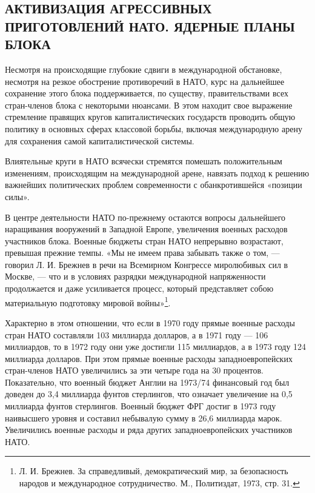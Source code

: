 \documentclass[12pt, a4paper, openany]{book}
\begin{document}
		\subsection[Активизация агрессивных приготовлений НАТО. Ядерные планы блока]{\center АКТИВИЗАЦИЯ АГРЕССИВНЫХ ПРИГОТОВЛЕНИЙ НАТО. ЯДЕРНЫЕ ПЛАНЫ БЛОКА}	
	
	
	Несмотря на происходящие глубокие сдвиги в международной обстановке, несмотря на резкое обострение противоречий в НАТО, курс на дальнейшее сохранение этого блока поддерживается, по существу, правительствами всех стран-членов блока с некоторыми нюансами. В этом находит свое выражение стремление правящих кругов капиталистических государств проводить общую политику в основных сферах классовой борьбы, включая международную арену для сохранения самой капиталистической системы.
	
	Влиятельные круги в НАТО всячески стремятся помешать положительным изменениям, происходящим на международной арене, навязать подход к решению важнейших политических проблем современности с обанкротившейся «позиции силы».
	
	В центре деятельности НАТО по-прежнему остаются вопросы дальнейшего наращивания вооружений в Западной Европе, увеличения военных расходов участников блока. Военные бюджеты стран НАТО непрерывно возрастают, превышая прежние темпы. «Мы не имеем права забывать также о том, — говорил Л. И. Брежнев в речи на Всемирном Конгрессе миролюбивых сил в Москве, — что и в условиях разрядки международной напряженности продолжается и даже усиливается процесс, который представляет собою материальную подготовку мировой войны»{\footnote{Л. И. Брежнев. За справедливый, демократический мир, за безопасность народов и международное сотрудничество. М., Политиздат, 1973, стр. 31.}}.
	
	Характерно в этом отношении, что если в 1970 году прямые военные расходы стран НАТО составляли 103 миллиарда долларов, а в 1971 году — 106 миллиардов, то в 1972 году они уже достигли 115 миллиардов, а в 1973 году 124 миллиарда долларов. При этом прямые военные расходы западноевропейских стран-членов НАТО увеличились за эти четыре года на 30 процентов. Показательно, что военный бюджет Англии на 1973/74 финансовый год был доведен до 3,4 миллиарда фунтов стерлингов, что означает увеличение на 0,5 миллиарда фунтов стерлингов. Военный бюджет ФРГ достиг в 1973 году наивысшего уровня и составил небывалую сумму в 26,6 миллиарда марок. Увеличились военные расходы и ряда других западноевропейских участников НАТО.
	
\end{document}
